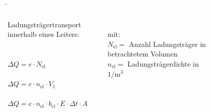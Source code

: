\begin{frame}
	\b{

	
	\begin{columns}
	  Ladungsträgertransport innerhalb eines Leiters:\\

		\phantom{.}\\

		\phantom{text}\\
		$\Delta Q = e \cdot N_\mathrm{el} $\\

		\phantom{text}\\

		$\Delta Q = e \cdot n_\mathrm{el} \cdot V_1$\\

		\phantom{text}\\

	$\Delta Q = e \cdot n_\mathrm{el} \cdot b_\mathrm{el} \cdot E \cdot \Delta t \cdot A$

		\phantom{.}\\

		mit:\\
		$N_\mathrm{el} =$ Anzahl Ladungsträger in betrachtetem Volumen\\

		$n_\mathrm{el} = $  Ladungsträgerdichte in $1/\mathrm{m}^3$






	

		
		


		\begin{figure}[h!]
			\centering
			

			
		\end{figure}


\end{columns}}
\end{frame}
